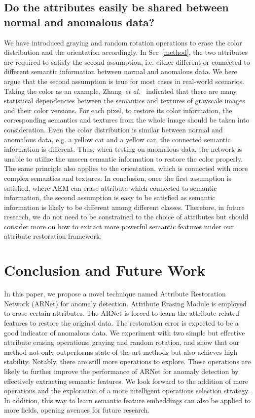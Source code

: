 \documentclass[journal]{IEEEtran}
\begin{document}
\subsection{Do the attributes easily be shared between normal and anomalous data?}
\label{sec:attribute share}
We have introduced graying and random rotation operations to erase the color distribution and the orientation accordingly. In Sec~\ref{method}, the two attributes are required to satisfy the second assumption, i.e. either different or connected to different semantic information between normal and anomalous data. We here argue that the second assumption is true for most cases in real-world scenarios. Taking the color as an example, Zhang~\emph{et al.}~\cite{zhang2016colorful} indicated that there are many statistical dependencies between the semantics and textures of grayscale images and their color versions. For each pixel, to restore its color information, the corresponding semantics and textures from the whole image should be taken into consideration. Even the color distribution is similar between normal and anomalous data, e.g. a yellow cat and a yellow car, the connected semantic information is different. Thus, when testing on anomalous data, the network is unable to utilize the unseen semantic information to restore the color properly. The same principle also applies to the orientation, which is connected with more complex semantics and textures. In conclusion, once the first assumption is satisfied, where AEM can erase attribute which connected to semantic information, the second assumption is easy to be satisfied as semantic information is likely to be different among different classes. Therefore, in future research, we do not need to be constrained to the choice of attributes but should consider more on how to extract more powerful semantic features under our attribute restoration framework.

\section{Conclusion and Future Work}
In this paper, we propose a novel technique named Attribute Restoration Network (ARNet) for anomaly detection. Attribute Erasing Module is employed to erase certain attributes. The ARNet is forced to learn the attribute related features to restore the original data. The restoration error is expected to be a good indicator of anomalous data. We experiment with two simple but effective attribute erasing operations: graying and random rotation, and show that our method not only outperforms state-of-the-art methods but also achieves high stability. Notably, there are still more operations to explore. These operations are likely to further improve the performance of ARNet for anomaly detection by effectively extracting semantic features. We look forward to the addition of more operations and the exploration of a more intelligent operations selection strategy. In addition, this way to learn semantic feature embeddings can also be applied to more fields, opening avenues for future research.
\end{document}
